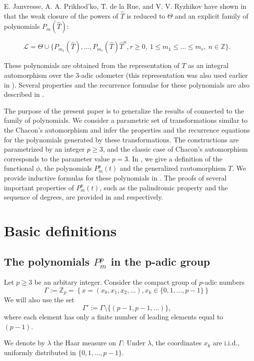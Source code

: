 \documentclass[a4paper]{article}
\theoremstyle{plain}
\theoremstyle{definition}
\begin{document}
E. Janvresse, A. A. Prikhod’ko, T. de la Rue, and V. V. Ryzhikov have shown in \cite{weaklimits} that the weak closure of the powers of $\hat{T}$ is reduced to $\Theta$
and an explicit family of polynomials $P_m(\hat{T})$:

$$
\mathcal{L} = {\Theta} \cup \{P_{m_1}(\hat{T}),\ldots,P_{m_r}(\hat{T})\hat{T}^n,r\ge0,\ 1\le m_1\le\ldots\le m_r,\ n\in \mathbb{Z}\}.
$$
 
 These polynomials are obtained from the representation of $T$ as an integral automorphism over the $3$-adic odometer (this representation was also used earlier in \cite{convolutions}). Several properties and the recurrence formulae for these polynomials are also described in \cite{weaklimits}.

The purpose of the present paper is to generalize the results of \cite{weaklimits} connected to the family of polynomials. We consider a parametric set of transformations similar to the Chacon’s automorphism and infer the properties and the recurrence equations for the polynomials generated by these transformations. The constructions are parametrized by an integer $p \ge 3$, and the classic case of Chacon's automorphism corresponds to the parameter value $p=3$. In , we give a definition of the functional $\phi$, the polynomials $P_m^p(t)$ and the generalized rautomorphism $T$. We provide
inductive formulas for these polynomials in . The proofs of several important properties of $P_m^p(t)$, such as the palindromic property and the sequence of degrees, are provided in  and  respectively. 

\section{Basic definitions}\label{definitions}
\subsection{The polynomials $P_m^p$ in the p-adic group}
Let $p \ge 3$ be an arbitary integer.
Consider the compact group of $p$-adic numbers
$$\Gamma := \mathbb{Z}_p = \left\{x = \left(x_0, x_1, x_2, \ldots \right), x_k \in \{0, 1, \ldots, p - 1\} \right\}$$
We will also use the set
$$\Gamma' := \Gamma \setminus \{(p-1,p-1,\ldots)\},$$
where each element has only a finite number of leading elements equal to $(p-1)$.

We denote by $\lambda$ the Haar measure on $\Gamma$: Under $\lambda$, the coordinates $x_k$ are i.i.d., uniformly distributed in $\{0, 1, \ldots, p - 1\}$.
\end{document}
